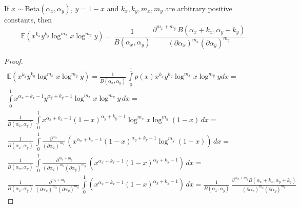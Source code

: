 \documentclass{article}
\begin{document}
\begin{theorem}
	If $x \sim \textrm{Beta}(\alpha_x, \alpha_y)$, $y = 1 - x$ and $k_x, k_y, m_x, m_y$ are arbitrary positive constants, then 
	\begin{equation}
	\mathbb{E}(x^{k_x} y^{k_y} \log^{m_x} x \log^{m_y} y) = \frac{1}{B(\alpha_x, \alpha_y)} \, \frac{\partial^{m_x + m_y} \, B(\alpha_x + k_x, \alpha_y + k_y)}{(\partial \alpha_x)^{m_x} (\partial \alpha_y)^{m_y}}
	\end{equation}
	\begin{proof}
		
		\begin{multline*}
		\mathbb{E}(x^{k_x} y^{k_y} \log^{m_x} x \log^{m_y} y) = 
		\frac{1}{B(\alpha_x, \alpha_y)} \, \int\limits_0^1{p(x) x^{k_x} y^{k_y} \log^{m_x} x \log^{m_y} y dx} =
		\\ \int\limits_0^1{x^{\alpha_x + k_x - 1} y^{\alpha_y + k_y - 1} \log^{m_x} x \log^{m_y} y \, dx} = 
		\\ \frac{1}{B(\alpha_x, \alpha_y)} \, \int\limits_0^1{x^{\alpha_x + k_x - 1} (1 - x)^{\alpha_y + k_y - 1} \log^{m_x} x \log^{m_y} (1 - x) \, dx} = 
		\\ \frac{1}{B(\alpha_x, \alpha_y)} \, \int\limits_0^1{ \frac{\partial^{m_x}}{(\partial \alpha_x)^{m_x}} \, (x^{\alpha_x + k_x - 1} (1 - x)^{\alpha_y + k_y - 1} \log^{m_y} (1 - x)) \, dx} = 
		\\ \frac{1}{B(\alpha_x, \alpha_y)} \, \int\limits_0^1{ \frac{\partial^{m_x + m_y}}{(\partial \alpha_x)^{m_x} (\partial \alpha_y)^{m_y}} \, (x^{\alpha_x + k_x - 1} (1 - x)^{\alpha_y + k_y - 1}) \, dx} = 
		\\ \frac{1}{B(\alpha_x, \alpha_y)} \, \frac{\partial^{m_x + m_y}}{(\partial \alpha_x)^{m_x} (\partial \alpha_y)^{m_y}} \, \int\limits_0^1{  (x^{\alpha_x + k_x - 1} (1 - x)^{\alpha_y + k_y - 1}) \, dx} = 
		\frac{1}{B(\alpha_x, \alpha_y)} \, \frac{\partial^{m_x + m_y} B(\alpha_x + k_x, \alpha_y + k_y)}{(\partial \alpha_x)^{m_x} (\partial \alpha_y)^{m_y}} 
		\end{multline*}
	\end{proof}
\end{theorem}
\end{document}
